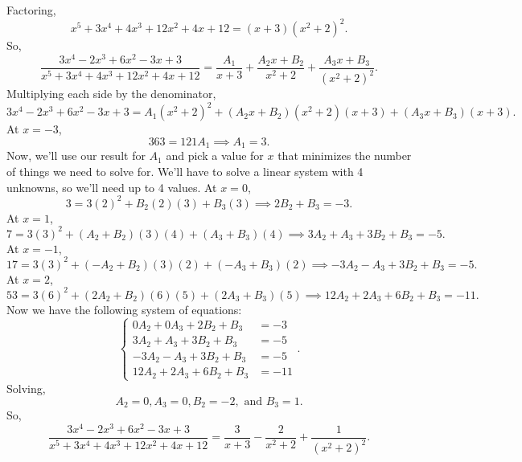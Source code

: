 \begin{answer}
	Factoring,
	\begin{equation*}
		x^5+3x^4+4x^3+12x^2+4x+12 = (x+3)(x^2+2)^2.
	\end{equation*}
	So,
	\begin{equation*}
		\frac{3x^4-2x^3+6x^2-3x+3}{x^5+3x^4+4x^3+12x^2+4x+12} = \frac{A_1}{x+3}+\frac{A_2x+B_2}{x^2+2}+\frac{A_3x+B_3}{(x^2+2)^2}.
	\end{equation*}
	Multiplying each side by the denominator,
	\begin{equation*}
		3x^4-2x^3+6x^2-3x+3 = A_1(x^2+2)^2+(A_2x+B_2)(x^2+2)(x+3)+(A_3x+B_3)(x+3).
	\end{equation*}
	At $x=-3$,
	\begin{equation*}
		363 = 121A_1 \implies A_1 = 3.
	\end{equation*}
	Now, we'll use our result for $A_1$ and pick a value for $x$ that minimizes the number of things we need to solve for. We'll have to solve a linear system with 4 unknowns, so we'll need up to 4 values.
	At $x=0$,
	\begin{equation*}
		3 = 3(2)^2 + B_2(2)(3)+B_3(3) \implies 2B_2 + B_3 = -3.
	\end{equation*}
	At $x=1$,
	\begin{equation*}
		7 = 3(3)^2 + (A_2+B_2)(3)(4) + (A_3+B_3)(4) \implies 3A_2 + A_3 + 3B_2 + B_3 = -5.
	\end{equation*}
	At $x=-1$,
	\begin{equation*}
		17 = 3(3)^2 + (-A_2+B_2)(3)(2) + (-A_3+B_3)(2) \implies -3A_2 - A_3 + 3B_2 + B_3 = -5.
	\end{equation*}
	At $x=2$,
	\begin{equation*}
		53 = 3(6)^2 + (2A_2+B_2)(6)(5) + (2A_3+B_3)(5) \implies 12A_2 + 2A_3 + 6B_2 + B_3 = -11.
	\end{equation*}
	Now we have the following system of equations:
	\begin{equation*}
		\begin{cases}
			0A_2  + 0A_3 + 2B_2 + B_3 &= -3 \\
			3A_2  + A_3  + 3B_2 + B_3 &= -5 \\
			-3A_2 - A_3  + 3B_2 + B_3 &= -5 \\
			12A_2 + 2A_3 + 6B_2 + B_3 &= -11
		\end{cases}.
	\end{equation*}
	Solving,
	\begin{equation*}
		A_2 = 0, A_3 = 0, B_2 = -2, \text{ and } B_3 = 1.
	\end{equation*}
	So,
	\begin{equation*}
		\frac{3x^4-2x^3+6x^2-3x+3}{x^5+3x^4+4x^3+12x^2+4x+12} = \frac{3}{x+3}-\frac{2}{x^2+2}+\frac{1}{(x^2+2)^2}.
	\end{equation*}
\end{answer}